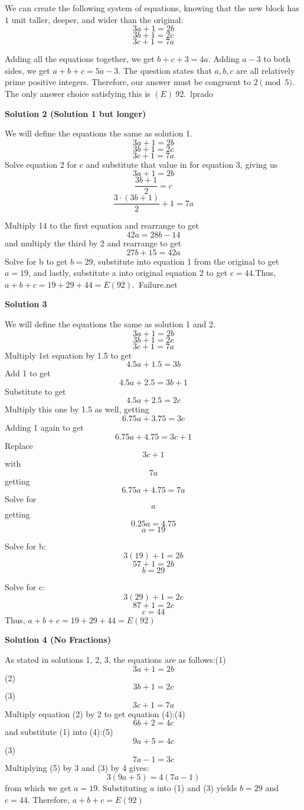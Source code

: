 \begin{enumerate}
 We can create the following system of equations, knowing that the new block has $1$ unit taller, deeper, and wider than the original:
 \[3a+1 = 2b\]
 \[3b+1=2c\]
 \[3c+1=7a\]

 Adding all the equations together, we get $b+c+3 = 4a$. Adding $a-3$ to both sides, we get $a+b+c = 5a-3$. The question states that $a,b,c$ are all relatively prime positive integers. Therefore, our answer must be congruent to $2 \pmod{5}$. The only answer choice satisfying this is $\boxed{(E)\ 92}$.~lprado

 



\textbf{Solution 2 (Solution 1 but longer)}

We will define the equations the same as solution 1.
 \[3a+1 = 2b\]
 \[3b+1=2c\]
 \[3c+1=7a\]Solve equation 2 for c and substitute that value in for equation 3, giving us
 \[3a+1 = 2b\]
 \[\frac{3b+1}{2}=c\]
 \[\frac{3 \cdot (3b+1)}{2}+1=7a\]

 Multiply 14 to the first equation and rearrange to get
 \[42a = 28b-14\]and multiply the third by 2 and rearrange to get
 \[27b+15 = 42a\]Solve for b to get $b = 29$, substitute into equation 1 from the original to get $a = 19$, and lastly, substitute a into original equation 2 to get $c = 44$.Thus, $a+b+c = 19+29+44 = \boxed{E(92)}$.~Failure.net

 



\textbf{Solution 3}

We will define the equations the same as solution 1 and 2.
 \[3a+1 = 2b\]
 \[3b+1=2c\]
 \[3c+1=7a\]Multiply 1st equation by 1.5 to get
 \[4.5a+1.5=3b\]Add 1 to get
 \[4.5a+2.5=3b+1\]Substitute to get
 \[4.5a+2.5=2c\]Multiply this one by 1.5 as well, getting
 \[6.75a+3.75=3c\]Adding 1 again to get
 \[6.75a+4.75=3c+1\]Replace 
 \[3c+1\] with 
 \[7a\] getting 
 \[6.75a+4.75=7a\]Solve for 
 \[a\] getting 
 \[0.25a=4.75\] 
 \[a=19\]

 Solve for b: 
 \[3(19)+1=2b\] 
 \[57+1=2b\] 
 \[b=29\]

 Solve for c: 
 \[3(29)+1=2c\] 
 \[87+1=2c\] 
 \[c=44\]Thus, $a+b+c = 19+29+44 = \boxed{E(92)}$




\textbf{Solution 4 (No Fractions)}

As stated in solutions 1, 2, 3, the equations are as follows:(1) 
 \[3a+1=2b\](2) 
 \[3b+1=2c\](3) 
 \[3c+1=7a\]Multiply equation (2) by 2 to get equation (4):(4) 
 \[6b+2=4c\]and substitute (1) into (4):(5) 
 \[9a+5=4c\](3) 
 \[7a-1=3c\]Multiplying (5) by 3 and (3) by 4 gives:
 \[3(9a+5)=4(7a-1)\]from which we get $a=19$. Substituting $a$ into (1) and (3) yields $b=29$ and $c=44$. Therefore, $a+b+c = \boxed{E(92)}$





\end{enumerate}
